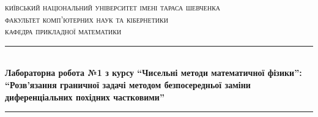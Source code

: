 
\setlength\parindent{0pt} %



\begin{titlepage}

\newcommand{\HRule}{\rule{\linewidth}{0.5mm}} %

\center %
 

\textsc{\Large київський національний університет імені тараса шевченка}\\[1.5cm] %
\textsc{\large факультет комп'ютерних наук та кібернетики}\\[0.5cm] %
\textsc{\large кафедра прикладної математики}\\[0.5cm] %


\HRule \\[0.4cm]
{ \Large \bfseries Лабораторна робота №1 з курсу “Чисельні методи математичної фізики”:}\\[0.4cm] %
{ \Large \bfseries “Розв'язання граничної задачі методом безпосередньої заміни диференціальних похідних частковими” }
\HRule \\[1.5cm]
 


\end{titlepage}
